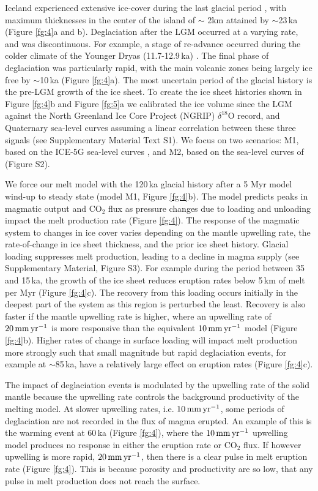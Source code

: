 \documentclass[draft,linenumbers]{agujournal2018}
\begin{document}
Iceland experienced extensive ice-cover during the last glacial period \citep{patton-etal-2017}, with maximum thicknesses in the center of the island of $\sim$ 2km attained by $\sim$23\,ka (Figure \ref{fg:4}a and b). Deglaciation after the LGM occurred at a varying rate, and was discontinuous. For example, a stage of re-advance occurred during the colder climate of the Younger Dryas (11.7-12.9\,ka) \citep{nordahl-2015}. The final phase of deglaciation was particularly rapid, with the main volcanic zones being largely ice free by $\sim$10\,ka (Figure \ref{fg:4}a). The most uncertain period of the glacial history is the pre-LGM growth of the ice sheet. To create the ice sheet histories shown in Figure \ref{fg:4}b and Figure \ref{fg:5}a we calibrated the ice volume since the LGM against the North Greenland Ice Core Project (NGRIP) $\delta^{18}$O record, and Quaternary sea-level curves assuming a linear correlation between these three signals (see Supplementary Material Text S1). We focus on two scenarios: M1, based on the ICE-5G sea-level curves \citep{peltier-2004}, and M2, based on the sea-level curves of \citet{pico-etal-2017} (Figure S2).

We force our melt model with the 120\,ka glacial history after a 5 Myr model wind-up to steady state (model M1, Figure \ref{fg:4}b). The model predicts peaks in magmatic output and CO$_{2}$ flux as pressure changes due to loading and unloading impact the melt production rate (Figure \ref{fg:4}). The response of the magmatic system to changes in ice cover varies depending on the mantle upwelling rate, the rate-of-change in ice sheet thickness, and the prior ice sheet history. Glacial loading suppresses melt production, leading to a decline in magma supply (see Supplementary Material, Figure S3). For example during the period between 35 and 15\,ka, the growth of the ice sheet reduces eruption rates below 5\,km of melt per Myr (Figure \ref{fg:4}c). The recovery from this loading occurs initially in the deepest part of the system as this region is perturbed the least. Recovery is also faster if the mantle upwelling rate is higher, where an upwelling rate of $20\rm\,mm\,yr^{-1}$ is more responsive than the equivalent $10\rm\,mm\,yr^{-1}$ model (Figure \ref{fg:4}b). Higher rates of change in surface loading will impact melt production more strongly such that small magnitude but rapid deglaciation events, for example at $\sim$85\,ka, have a relatively large effect on eruption rates (Figure \ref{fg:4}c).

The impact of deglaciation events is modulated by the upwelling rate of the solid mantle because the upwelling rate controls the background productivity of the melting model. At slower upwelling rates, i.e. $10\rm\,mm\,yr^{-1}$, some periods of deglaciation are not recorded in the flux of magma erupted. An example of this is the warming event at 60\,ka (Figure \ref{fg:4}), where the $10\rm\,mm\,yr^{-1}$ upwelling model produces no response in either the eruption rate or CO$_{2}$ flux. If however upwelling is more rapid, $20\rm\,mm\,yr^{-1}$, then there is a clear pulse in melt eruption rate (Figure \ref{fg:4}). This is because porosity and productivity are so low, that any pulse in melt production does not reach the surface.
\end{document}
